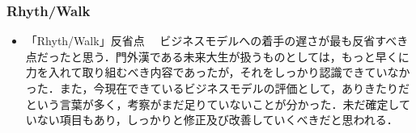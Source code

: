 \subsubsection{Rhyth/Walk}
\begin{itemize}
　「Cool Japanimation」と同様の期間で，同じく未来大のみで書類を作成した．場所を問わず何度も会議を重ね，もらったレビューに対してどうすべきかを班の皆で話し合い，完成へと扱ぎ付けた．収支予測など分からないことは昨年の例やネット文献，先輩の助言などを頼りに調べ，分からないなりにうまく仕上げることができた．しかし，こちらも「Cool Japanimation」同様一次審査を通過することは叶わなかった．
\item「Rhyth/Walk」反省点
　ビジネスモデルへの着手の遅さが最も反省すべき点だったと思う．門外漢である未来大生が扱うものとしては，もっと早くに力を入れて取り組むべき内容であったが，それをしっかり認識できていなかった．また，今現在できているビジネスモデルの評価として，ありきたりだという言葉が多く，考察がまだ足りていないことが分かった．未だ確定していない項目もあり，しっかりと修正及び改善していくべきだと思われる．
\end{itemize}
